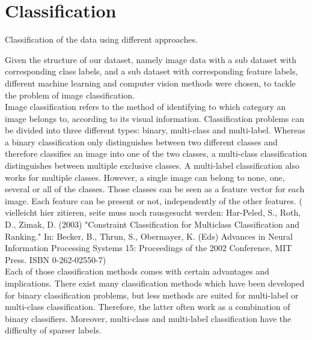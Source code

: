 \section{Classification}

Classification of the data using different approaches.

Given the structure of our dataset, namely image data with a sub dataset with corresponding class labels, and a sub dataset with corresponding feature labels, different machine learning and computer vision methods were chosen, to tackle the problem of image classification. \\

Image classification refers to the method of identifying to which category an image belongs to, according to its visual information.  Classification problems can be divided into three different types: binary, multi-class and multi-label. Whereas a binary classification only distinguishes between two different classes and therefore classifies an image into one of the two classes, a multi-class classification distinguishes between multiple exclusive classes. A multi-label classification also works for multiple classes. However, a single image can belong to none, one, several or all of the classes. Those classes can be seen as a feature vector for each image. Each feature can be present or not, independently of the other features. ( vielleicht hier zitieren, seite muss noch rausgesucht werden: Har-Peled, S., Roth, D., Zimak, D. (2003) "Constraint Classification for Multiclass Classification and Ranking." In: Becker, B., Thrun, S., Obermayer, K. (Eds) Advances in Neural Information Processing Systems 15: Proceedings of the 2002 Conference, MIT Press. ISBN 0-262-02550-7) \\

Each of those classification methods comes with certain advantages and implications.
There exist many classification methods which have been developed for binary classification problems, but less methods are suited for multi-label or multi-class classification. Therefore, the latter often work as a combination of binary classifiers. Moreover, multi-class and multi-label classification have the difficulty of sparser labels. \\

